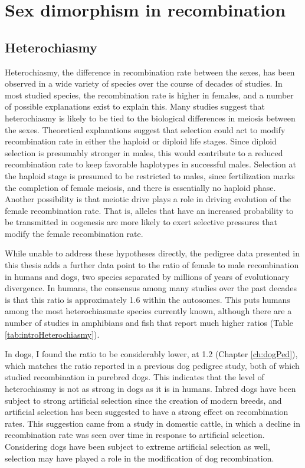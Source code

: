 \section{Sex dimorphism in recombination}

\subsection{Heterochiasmy}

Heterochiasmy, the difference in recombination rate between the sexes, has been observed in a wide variety of species over the course of decades of studies.
In most studied species, the recombination rate is higher in females, and a number of possible explanations exist to explain this.
Many studies suggest that heterochiasmy is likely to be tied to the biological differences in meiosis between the sexes.
Theoretical explanations suggest that selection could act to modify recombination rate in either the haploid or diploid life stages.
Since diploid selection is presumably stronger in males, this would contribute to a reduced recombination rate to keep favorable haplotypes in successful males\cite{Trivers1988}.
Selection at the haploid stage is presumed to be restricted to males, since fertilization marks the completion of female meiosis, and there is essentially no haploid phase\cite{Lenormand2005}.
Another possibility is that meiotic drive plays a role in driving evolution of the female recombination rate.
That is, alleles that have an increased probability to be transmitted in oogenesis are more likely to exert selective pressures that modify the female recombination rate\cite{Brandvain2012}.

While unable to address these hypotheses directly, the pedigree data presented in this thesis adds a further data point to the ratio of female to male recombination in humans and dogs, two species separated by millions of years of evolutionary divergence.
In humans, the consensus among many studies over the past decades is that this ratio is approximately 1.6 within the autosomes.
This puts humans among the most heterochiasmate species currently known, although there are a number of studies in amphibians and fish that report much higher ratios (Table \ref{tab:introHeterochiasmy}).

In dogs, I found the ratio to be considerably lower, at 1.2 (Chapter \ref{ch:dogPed}), which matches the ratio reported in a previous dog pedigree study\cite{Wong2010}, both of which studied recombination in purebred dogs.
This indicates that the level of heterochiasmy is not as strong in dogs as it is in humans.
Inbred dogs have been subject to strong artificial selection since the creation of modern breeds, and artificial selection has been suggested to have a strong effect on recombination rates.
This suggestion came from a study in domestic cattle, in which a decline in recombination rate was seen over time in response to artificial selection\cite{Ma2015}.
Considering dogs have been subject to extreme artificial selection as well, selection may have played a role in the modification of dog recombination.


